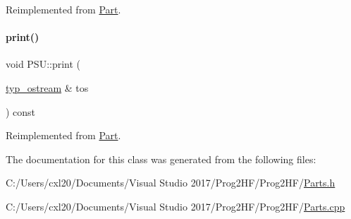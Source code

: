 Reimplemented from \mbox{\hyperlink{class_part_aa602d876151b63db72cf8f666847a8cd}{Part}}.

\mbox{\label{class_p_s_u_a3690cd51ec36d4a1417c22612793e01c}} 
\paragraph{\texorpdfstring{print()}{print()}\hspace{0.1cm}{\footnotesize\ttfamily [4/4]}}
{\footnotesize\ttfamily void P\+S\+U\+::print (\begin{DoxyParamCaption}\item[{\mbox{\hyperlink{structtyp__ostream}{typ\+\_\+ostream}} \&}]{tos }\end{DoxyParamCaption}) const\hspace{0.3cm}{\ttfamily [virtual]}}



Reimplemented from \mbox{\hyperlink{class_part_ab6396030e8b7a724731a8b54bd4942fc}{Part}}.



The documentation for this class was generated from the following files\+:\begin{DoxyCompactItemize}
\item 
C\+:/\+Users/cxl20/\+Documents/\+Visual Studio 2017/\+Prog2\+H\+F/\+Prog2\+H\+F/\mbox{\hyperlink{_parts_8h}{Parts.\+h}}\item 
C\+:/\+Users/cxl20/\+Documents/\+Visual Studio 2017/\+Prog2\+H\+F/\+Prog2\+H\+F/\mbox{\hyperlink{_parts_8cpp}{Parts.\+cpp}}\end{DoxyCompactItemize}
